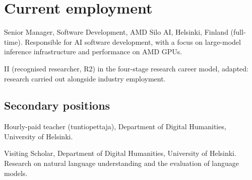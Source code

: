 \documentclass[12pt,a4paper]{article}
\newenvironment{entries}{%
  \begin{list}{}{%
    \setlength{\labelwidth}{2.7cm}%
    \setlength{\labelsep}{0.3cm}%
    \setlength{\leftmargin}{3.0cm}%
    \setlength{\itemsep}{2pt}%
    \setlength{\parsep}{0pt}%
    \setlength{\topsep}{1pt}%
    \renewcommand{\makelabel}[1]{##1\hfil}}}%
  {\end{list}}
\begin{document}
\section{Current employment}
\begin{entries}
  \item[10/2025--] Senior Manager, Software Development, AMD Silo AI, Helsinki, Finland (full-time). Responsible for AI software development, with a focus on large-model inference infrastructure and performance on AMD GPUs.
  \item[Career stage] II (recognised researcher, R2) in the four-stage research career model, adapted: research carried out alongside industry employment.
\end{entries}
\subsection{Secondary positions}
\begin{entries}
  \item[2024--] Hourly-paid teacher (tuntiopettaja), Department of Digital Humanities, University of Helsinki.
  \item[2023--] Visiting Scholar, Department of Digital Humanities, University of Helsinki. Research on natural language understanding and the evaluation of language models.
\end{entries}
\end{document}
